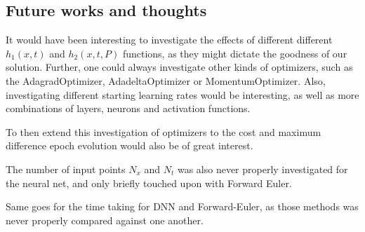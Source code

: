 \subsection{Future works and thoughts}
It would have been interesting to investigate the effects of different different $h_1(x,t)$ and $h_2(x,t,P)$ functions, as they might dictate the goodness of our solution. Further, one could always investigate other kinds of optimizers, such as the AdagradOptimizer, AdadeltaOptimizer or MomentumOptimizer. Also, investigating different starting learning rates would be interesting, as well as more combinations of layers, neurons and activation functions.

To then extend this investigation of optimizers to the cost and maximum difference epoch evolution would also be of great interest.

The number of input points $N_x$ and $N_t$ was also never properly investigated for the neural net, and only briefly touched upon with Forward Euler.

Same goes for the time taking for DNN and Forward-Euler, as those methods was never properly compared against one another.